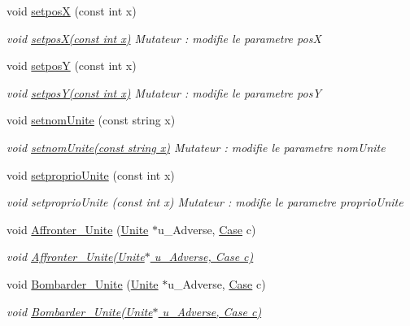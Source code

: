 \begin{DoxyCompactItemize}
void \hyperlink{classUnite_a4a3063dd3b9e9f262fc7360d4fe5e328}{setposX} (const int x)
\begin{DoxyCompactList}\small\item\em void \hyperlink{classUnite_a4a3063dd3b9e9f262fc7360d4fe5e328}{setpos\+X(const int x)} Mutateur \+: modifie le parametre posX \end{DoxyCompactList}\item 
void \hyperlink{classUnite_ab3d666a198a855801e28dd914b91a81b}{setposY} (const int x)
\begin{DoxyCompactList}\small\item\em void \hyperlink{classUnite_ab3d666a198a855801e28dd914b91a81b}{setpos\+Y(const int x)} Mutateur \+: modifie le parametre posY \end{DoxyCompactList}\item 
void \hyperlink{classUnite_a3f65635785e6c543dc98de498c830eab}{setnom\+Unite} (const string x)
\begin{DoxyCompactList}\small\item\em void \hyperlink{classUnite_a3f65635785e6c543dc98de498c830eab}{setnom\+Unite(const string x)} Mutateur \+: modifie le parametre nom\+Unite \end{DoxyCompactList}\item 
void \hyperlink{classUnite_acbf9154f4d45330b02525376ef286970}{setproprio\+Unite} (const int x)
\begin{DoxyCompactList}\small\item\em void setproprio\+Unite (const int x) Mutateur \+: modifie le parametre proprio\+Unite \end{DoxyCompactList}\item 
void \hyperlink{classUnite_a6bdba152d60733e7805d841409af932d}{Affronter\+\_\+\+Unite} (\hyperlink{classUnite}{Unite} $\ast$u\+\_\+\+Adverse, \hyperlink{classCase}{Case} c)
\begin{DoxyCompactList}\small\item\em void \hyperlink{classUnite_a6bdba152d60733e7805d841409af932d}{Affronter\+\_\+\+Unite(\+Unite$\ast$ u\+\_\+\+Adverse, Case c)} \end{DoxyCompactList}\item 
void \hyperlink{classUnite_ab7deefcee36cfaf50860b5292b6d4d30}{Bombarder\+\_\+\+Unite} (\hyperlink{classUnite}{Unite} $\ast$u\+\_\+\+Adverse, \hyperlink{classCase}{Case} c)
\begin{DoxyCompactList}\small\item\em void \hyperlink{classUnite_ab7deefcee36cfaf50860b5292b6d4d30}{Bombarder\+\_\+\+Unite(\+Unite$\ast$ u\+\_\+\+Adverse, Case c)} \end{DoxyCompactList}\item 

\end{DoxyCompactItemize}
